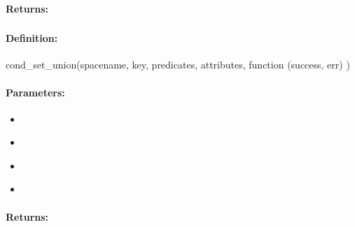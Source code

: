 \paragraph{Returns:}


\pagebreak
\subsubsection{}
\label{api:nodejs:cond_set_union}


\paragraph{Definition:}
\begin{javascriptcode}
cond_set_union(spacename, key, predicates, attributes, function (success, err) {})
\end{javascriptcode}
\paragraph{Parameters:}
\begin{itemize}[noitemsep]
\item {}\\

\item {}\\

\item {}\\

\item {}\\

\end{itemize}

\paragraph{Returns:}


\pagebreak
\subsubsection{}
\label{api:nodejs:map_add}



